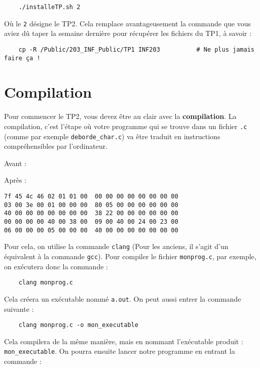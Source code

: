 \documentclass[10pt]{article}
\begin{document}
\begin{verbatim}
    ./installeTP.sh 2
\end{verbatim}

Où le {\tt 2} désigne le TP2. Cela remplace avantageusement la
commande que vous aviez dû taper la semaine dernière pour récupérer
les fichiers du TP1, à savoir :

\begin{verbatim}
    cp -R /Public/203_INF_Public/TP1 INF203          # Ne plus jamais faire ça !
\end{verbatim}

\section{Compilation}

Pour commencer le TP2, vous devez être au clair avec la
\textbf{compilation}. La compilation, c'est l'étape où votre programme
qui se trouve dans un fichier {\tt .c} (comme par exemple {\tt deborde\_char.c})
va être traduit en instructions compréhensibles par l'ordinateur.

\vspace*{0.2cm}

Avant :



Après :

\begin{lstlisting}
7f 45 4c 46 02 01 01 00  00 00 00 00 00 00 00 00
03 00 3e 00 01 00 00 00  80 05 00 00 00 00 00 00
40 00 00 00 00 00 00 00  38 22 00 00 00 00 00 00
00 00 00 00 40 00 38 00  09 00 40 00 24 00 23 00
06 00 00 00 05 00 00 00  40 00 00 00 00 00 00 00
\end{lstlisting}

Pour cela, on utilise la commande {\tt clang} (Pour les anciens, il
s'agit d'un équivalent à la commande {\tt gcc}). Pour compiler le
fichier {\tt monprog.c}, par exemple, on exécutera donc la commande :

\begin{verbatim}
    clang monprog.c
\end{verbatim}

Cela créera un exécutable nommé {\tt a.out}. On peut aussi entrer la
commande suivante :

\begin{verbatim}
    clang monprog.c -o mon_executable
\end{verbatim}

Cela compilera de la même manière, mais en nommant l'exécutable
produit : {\tt mon\_executable}. On pourra ensuite lancer notre
programme en entrant la commande :
\end{document}
